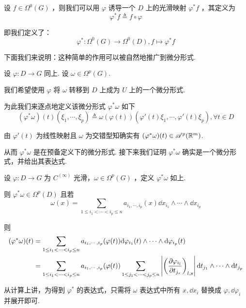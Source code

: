 设 $f\in\Omega^0(G)$ ，则我们可以用 $\varphi$ 诱导一个 $D$ 上的光滑映射 $\varphi^*f$ ，其定义为
$$
\varphi^*f\triangleq f\circ\varphi
$$


即我们定义了：
$$
\varphi^*:\Omega^0(G)\to\Omega^0(D),f\mapsto\varphi^*f
$$

下面我们来说明：这种简单的作用可以被自然地推广到微分形式.

设 $\varphi:D\to G$ 同上. 设 $\omega\in\Omega^p(G)$.

我们希望使用 $\varphi$ 将 $\omega$ 转移到 $D$ 上成为 $U$ 上的一个微分形式.

为此我们来逐点地定义该微分形式 $\varphi^*\omega$ 如下
$$
(\varphi^*\omega)(t)(\xi_1,\cdots,\xi_p)\triangleq\omega(\varphi(t))(\varphi'(t)\xi_1,\cdots,\varphi'(t)\xi_p),\forall t\in D
$$


由 $\varphi'(t)$ 为线性映射且 $\omega$ 为交错型知确实有 $(\varphi^*\omega)(t)\in\mathscr{A}^p(\mathbb{R}^m)$.

从而 $\varphi^*\omega$ 是在预备定义下的微分形式. 接下来我们证明 $\varphi^*\omega$ 确实是一个微分形式，并给出其表达式.

\begin{property}
    设 $\varphi:D\to G$ 为 $C^{(\infty)}$ 光滑，$\omega\in\Omega^p(G)$ ，定义 $\varphi^*\omega$ 如上.

    则 $\varphi^*\omega\in\Omega^p(D)$ 且若
$$
\omega(x)=\sum_{1\le i_1<\cdots<i_p\le n}a_{i_1,\cdots,i_p}(x)\dd x_{i_1}\wedge\cdots\wedge\dd x_{i_p}
$$

    则
$$
\begin{aligned}
(\varphi^*\omega)(t)&=\sum_{1\le i_1<\cdots<i_p\le n}a_{i_1,\cdots,i_p}(\varphi(t))\mathrm{d}\varphi_{i_1}(t)\wedge\cdots\wedge\mathrm{d}\varphi_{i_p}(t)\\
&=\sum_{1\le i_1<\cdots<i_p\le n}a_{i_1,\cdots,i_p}(\varphi(t))\sum_{1\le j_1<\cdots<j_p\le n}\left\lvert\left(\frac{\partial{\varphi_{i_l}}}{\partial{t_{j_s}}}\right)_{l,s}\right\rvert\mathrm{d} t_{j_1}\wedge\cdots\wedge\mathrm{d} t_{j_p}
\end{aligned}
$$
\end{property}

\begin{hint}
    从计算上讲，为得到 $\varphi^*$ 的表达式，只需将 $\omega$ 表达式中所有 $x,\dd x_i$ 替换成 $\varphi,\dd\varphi_i$ 并展开即可.
\end{hint}

